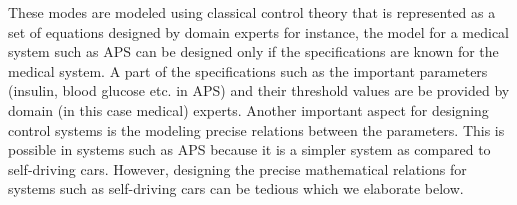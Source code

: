 These modes are modeled using classical control theory that is represented as a set of equations designed by domain experts
for instance, the model for a medical system such as \ac{APS} can be designed only if the specifications are known for the medical system. 
A part of the specifications such as the important parameters (insulin, blood glucose etc. in APS) and their threshold values are be provided by domain (in this case medical) experts. 
Another important aspect for designing control systems is the  modeling precise relations between the parameters. 
This is possible in systems such as APS because it is a simpler system as compared to self-driving cars. 
However, designing the precise mathematical relations for systems such as self-driving cars can be tedious \cite{article23} which we elaborate below.

